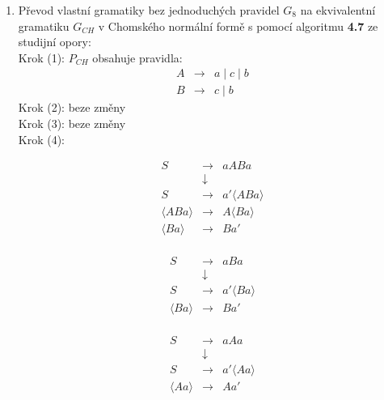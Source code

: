 \documentclass[a4paper,11pt]{article}[24.3.2010]
\begin{document}
\begin{enumerate}
\begin{enumerate}
      \item Převod vlastní gramatiky bez jednoduchých pravidel $G_{8}$ na ekvivalentní gramatiku $G_{CH}$ v Chomského normální formě s pomocí algoritmu \textbf{4.7} ze studijní opory:\\

      Krok (1): $P_{CH}$ obsahuje pravidla:
     \begin{eqnarray*}
      A&\rightarrow&a \mid c \mid b\\
      B&\rightarrow&c \mid b
      \end{eqnarray*}
      Krok (2): beze změny\\
      Krok (3): beze změny\\
      Krok (4):\\
      \begin{minipage}{.3\linewidth}
      \begin{eqnarray*}
       S&\rightarrow&aABa\\
        &\downarrow&\\
       S&\rightarrow&a' \langle ABa \rangle\\
       \langle ABa \rangle&\rightarrow&A\langle Ba \rangle\\
       \langle Ba \rangle&\rightarrow&Ba'\\
      \end{eqnarray*}
      \end{minipage}%
      \begin{minipage}{.3\linewidth}
      \begin{eqnarray*}
       S&\rightarrow&aBa\\
        &\downarrow&\\
       S&\rightarrow&a' \langle Ba \rangle\\
       \langle Ba \rangle&\rightarrow&Ba'\\
      \end{eqnarray*}
      \end{minipage}
      \begin{minipage}{.3\linewidth}
      \begin{eqnarray*}
       S&\rightarrow&aAa\\
        &\downarrow&\\
       S&\rightarrow&a' \langle Aa \rangle\\
       \langle Aa \rangle&\rightarrow&Aa'\\
      \end{eqnarray*}
      \end{minipage}


\end{enumerate}
\end{enumerate}
\end{document}
